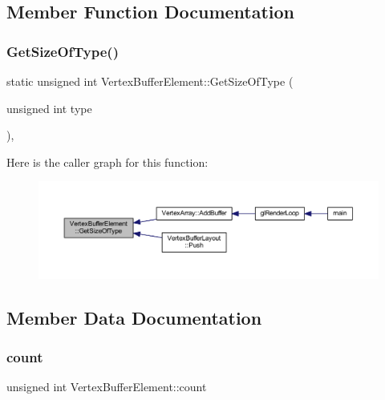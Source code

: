 \subsection{Member Function Documentation}
\mbox{\label{struct_vertex_buffer_element_a8465417a435f8bcd68a71bc414f1d0ee}} 
\subsubsection{\texorpdfstring{Get\+Size\+Of\+Type()}{GetSizeOfType()}}
{\footnotesize\ttfamily static unsigned int Vertex\+Buffer\+Element\+::\+Get\+Size\+Of\+Type (\begin{DoxyParamCaption}\item[{unsigned int}]{type }\end{DoxyParamCaption})\hspace{0.3cm}{\ttfamily [inline]}, {\ttfamily [static]}}

Here is the caller graph for this function\+:
\nopagebreak
\begin{figure}[H]
\begin{center}
\leavevmode
\includegraphics[width=350pt]{struct_vertex_buffer_element_a8465417a435f8bcd68a71bc414f1d0ee_icgraph}
\end{center}
\end{figure}


\subsection{Member Data Documentation}
\mbox{\label{struct_vertex_buffer_element_af2d13355b799b11b6ffbc0a34fb03f8a}} 
\subsubsection{\texorpdfstring{count}{count}}
{\footnotesize\ttfamily unsigned int Vertex\+Buffer\+Element\+::count}

